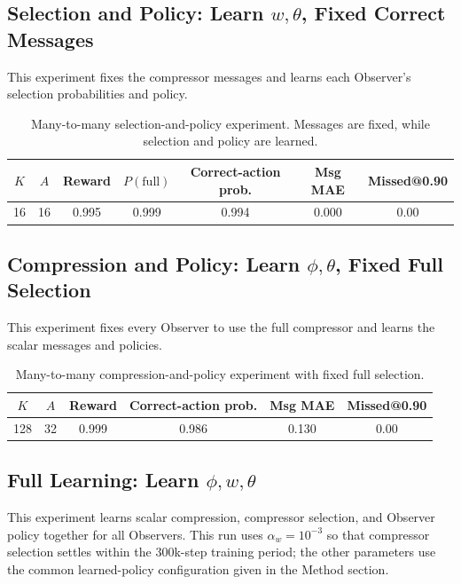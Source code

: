 \documentclass[11pt]{article}
\begin{document}
\subsection{Selection and Policy: Learn \(w,\theta\), Fixed Correct Messages}

This experiment fixes the compressor messages and learns each Observer's
selection probabilities and policy.

\begin{table}[H]
\centering
\small
\begin{tabular}{ccccccc}
\toprule
\(K\) & \(A\) & Reward & \(P(\mathrm{full})\) & Correct-action prob. & Msg MAE & Missed@0.90 \\
\midrule
16 & 16 & 0.995 & 0.999 & 0.994 & 0.000 & 0.00 \\
\bottomrule
\end{tabular}
\caption{Many-to-many selection-and-policy experiment. Messages are fixed, while
selection and policy are learned.}
\label{tab:many-to-many-w-theta}
\end{table}

\subsection{Compression and Policy: Learn \(\phi,\theta\), Fixed Full Selection}

This experiment fixes every Observer to use the full compressor and learns the
scalar messages and policies.

\begin{table}[H]
\centering
\small
\begin{tabular}{cccccc}
\toprule
\(K\) & \(A\) & Reward & Correct-action prob. & Msg MAE & Missed@0.90 \\
\midrule
128 & 32 & 0.999 & 0.986 & 0.130 & 0.00 \\
\bottomrule
\end{tabular}
\caption{Many-to-many compression-and-policy experiment with fixed full
selection.}
\label{tab:many-to-many-phi-theta}
\end{table}

\subsection{Full Learning: Learn \(\phi,w,\theta\)}

This experiment learns scalar compression, compressor selection, and Observer
policy together for all Observers. This run uses
\(\alpha_w=10^{-3}\) so that compressor selection settles within the 300k-step
training period; the other parameters use the common learned-policy
configuration given in the Method section.
\end{document}
